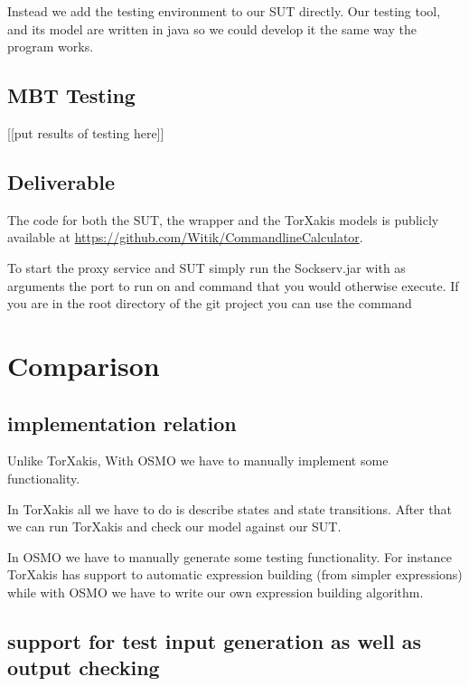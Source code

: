 \documentclass[11pt,a4paper]{article}
\begin{document}
Instead we add the testing environment to our SUT directly. Our
testing tool, and its model are written in java so we could develop it
the same way the program works.

\subsection{MBT Testing}

[[put results of testing here]]

\subsection{Deliverable}

The code for both the SUT, the wrapper and the TorXakis models is
publicly available at
\url{https://github.com/Witik/CommandlineCalculator}.

To start the proxy service and SUT simply run the Sockserv.jar with as
arguments the port to run on and command that you would otherwise
execute. If you are in the root directory of the git project you can
use the command

\section{Comparison}
\subsection{implementation relation}
Unlike TorXakis, With OSMO we have to manually implement some functionality.

In TorXakis all we have to do is describe states and state
transitions. After that we can run TorXakis and check our model
against our SUT.

In OSMO we have to manually generate some testing functionality. For
instance TorXakis has support to automatic expression building (from
simpler expressions) while with OSMO we have to write our own
expression building algorithm.

\subsection{support for test input generation as well as output checking}
\end{document}
